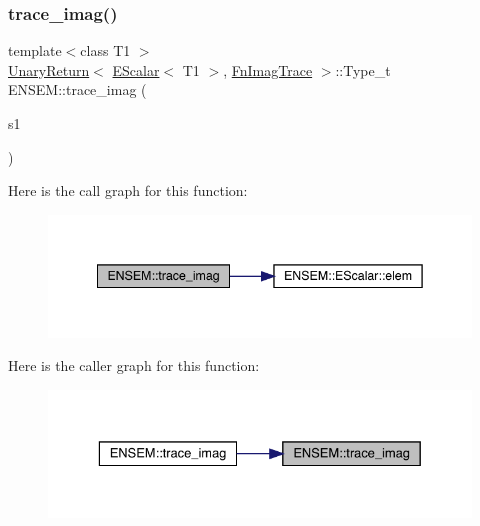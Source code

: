 \subsubsection{\texorpdfstring{trace\_imag()}{trace\_imag()}}
{\footnotesize\ttfamily template$<$class T1 $>$ \\
\mbox{\hyperlink{structENSEM_1_1UnaryReturn}{Unary\+Return}}$<$ \mbox{\hyperlink{classENSEM_1_1EScalar}{E\+Scalar}}$<$ T1 $>$, \mbox{\hyperlink{structENSEM_1_1FnImagTrace}{Fn\+Imag\+Trace}} $>$\+::Type\+\_\+t E\+N\+S\+E\+M\+::trace\+\_\+imag (\begin{DoxyParamCaption}\item[{const \mbox{\hyperlink{classENSEM_1_1EScalar}{E\+Scalar}}$<$ T1 $>$ \&}]{s1 }\end{DoxyParamCaption})\hspace{0.3cm}{\ttfamily [inline]}}

Here is the call graph for this function\+:
\nopagebreak
\begin{figure}[H]
\begin{center}
\leavevmode
\includegraphics[width=342pt]{d4/dca/group__escalar_gad2c4bd25b83ec8aa100ff58b6b773d8c_cgraph}
\end{center}
\end{figure}
Here is the caller graph for this function\+:
\nopagebreak
\begin{figure}[H]
\begin{center}
\leavevmode
\includegraphics[width=329pt]{d4/dca/group__escalar_gad2c4bd25b83ec8aa100ff58b6b773d8c_icgraph}
\end{center}
\end{figure}
\mbox{\label{group__escalar_gac6853fb7b9f9b61b97cda696c804ab0a}} 
